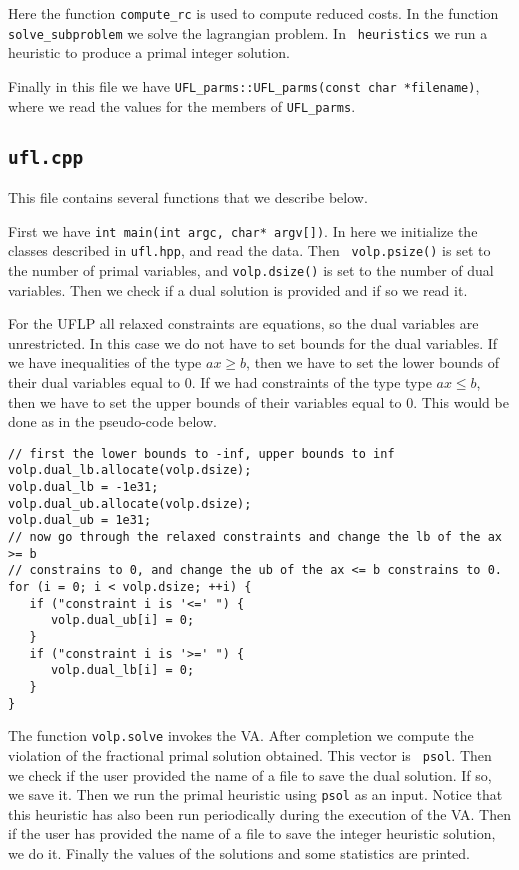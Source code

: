 \documentclass{article}
\begin{document}
Here the function {\tt compute\_rc} is used to compute reduced costs. In the
function {\tt solve\_subproblem} we solve the lagrangian problem. In {\tt
heuristics} we run a heuristic to produce a primal integer solution.

Finally in this file we have {\tt UFL\_parms::UFL\_parms(const char
*filename)}, where we read the values for the members of {\tt UFL\_parms}.


\subsection{{\tt ufl.cpp}}

This file contains several functions that we describe below.

First we have {\tt int main(int argc, char* argv[])}. In here we initialize
the classes described in {\tt ufl.hpp}, and read the data. Then {\tt
volp.psize()} is set to the number of primal variables, and {\tt volp.dsize()}
is set to the number of dual variables. Then we check if a dual solution is
provided and if so we read it.

For the UFLP all relaxed constraints are equations, so the dual variables are
unrestricted. In this case we do not have to set bounds for the dual
variables. If we have inequalities of the type $ax \ge b$, then we have to set
the lower bounds of their dual variables equal to 0. If we had constraints of
the type type $ax \le b$, then we have to set the upper bounds of their
variables equal to 0. This would be done as in the pseudo-code below.

\begin{verbatim}
// first the lower bounds to -inf, upper bounds to inf 
volp.dual_lb.allocate(volp.dsize);
volp.dual_lb = -1e31;
volp.dual_ub.allocate(volp.dsize);
volp.dual_ub = 1e31;
// now go through the relaxed constraints and change the lb of the ax >= b
// constrains to 0, and change the ub of the ax <= b constrains to 0.
for (i = 0; i < volp.dsize; ++i) {
   if ("constraint i is '<=' ") {
      volp.dual_ub[i] = 0;
   }
   if ("constraint i is '>=' ") {
      volp.dual_lb[i] = 0;
   }
}
\end{verbatim}

The function {\tt volp.solve} invokes the VA. After completion we compute the
violation of the fractional primal solution obtained. This vector is {\tt
psol}. Then we check if the user provided the name of a file to save the dual
solution. If so, we save it. Then we run the primal heuristic using {\tt psol}
as an input. Notice that this heuristic has also been run periodically during
the execution of the VA. Then if the user has provided the name of a file to
save the integer heuristic solution, we do it. Finally the values of the
solutions and some statistics are printed.
\end{document}
